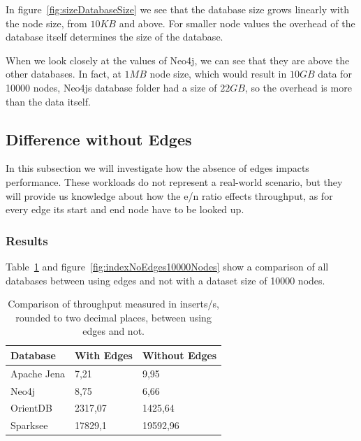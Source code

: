 In figure~\ref{fig:sizeDatabaseSize} we see that the database size grows linearly with the node size,
from $ 10KB $ and above.
For smaller node values the overhead of the database itself determines the size of the database.

When we look closely at the values of Neo4j,
we can see that they are above the other databases.
In fact,
at $ 1MB $ node size,
which would result in $ 10GB $ data for 10000 nodes,
Neo4js database folder had a size of $ 22GB $,
so the overhead is more than the data itself.

\subsection{Difference without Edges}
\label{ch:evaluation:se:differenceEdges}
In this subsection we will investigate how the absence of edges impacts performance.
These workloads do not represent a real-world scenario,
but they will provide us knowledge about how the e/n ratio effects throughput,
as for every edge its start and end node have to be looked up.

\subsubsection{Results}
Table~\ref{tab:indexNoEdges10000Nodes} and figure~\ref{fig:indexNoEdges10000Nodes} show a comparison of all databases between using edges and not with a dataset size of 10000 nodes.

\begin{table}[h!]
  \begin{minipage}{\textwidth}
    \centering
    \begin{tabular}{ | l | l | l | }
      \hline
      Database & With Edges & Without Edges \\ \hline
      Apache Jena & 7,21 & 9,95 \\ \hline
      Neo4j & 8,75 & 6,66 \\ \hline
      OrientDB & 2317,07 & 1425,64 \\ \hline
      Sparksee & 17829,1 & 19592,96 \\ \hline
    \end{tabular}
  \end{minipage}
  \caption{Comparison of throughput measured in inserts/s, rounded to two decimal places, between using edges and not.}
  \label{tab:indexNoEdges10000Nodes}
\end{table}

